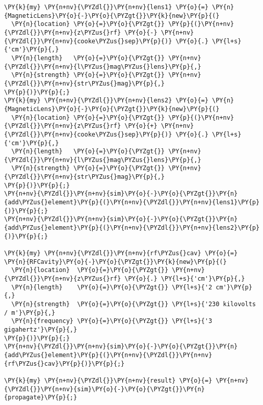\begin{Verbatim}[commandchars=\\\{\}]
\PY{k}{my} \PY{n+nv}{\PYZdl{}}\PY{n+nv}{lens1} \PY{o}{=} \PY{n}{MagneticLens}\PY{o}{-}\PY{o}{\PYZgt{}}\PY{k}{new}\PY{p}{(}
  \PY{n}{location} \PY{o}{=}\PY{o}{\PYZgt{}} \PY{p}{(}\PY{n+nv}{\PYZdl{}}\PY{n+nv}{z\PYZus{}rf} \PY{o}{-} \PY{n+nv}{\PYZdl{}}\PY{n+nv}{cooke\PYZus{}sep}\PY{p}{)} \PY{o}{.} \PY{l+s}{'cm'}\PY{p}{,}
  \PY{n}{length}   \PY{o}{=}\PY{o}{\PYZgt{}} \PY{n+nv}{\PYZdl{}}\PY{n+nv}{l\PYZus{}mag\PYZus{}lens}\PY{p}{,}
  \PY{n}{strength} \PY{o}{=}\PY{o}{\PYZgt{}} \PY{n+nv}{\PYZdl{}}\PY{n+nv}{str\PYZus{}mag}\PY{p}{,}
\PY{p}{)}\PY{p}{;}
\PY{k}{my} \PY{n+nv}{\PYZdl{}}\PY{n+nv}{lens2} \PY{o}{=} \PY{n}{MagneticLens}\PY{o}{-}\PY{o}{\PYZgt{}}\PY{k}{new}\PY{p}{(}
  \PY{n}{location} \PY{o}{=}\PY{o}{\PYZgt{}} \PY{p}{(}\PY{n+nv}{\PYZdl{}}\PY{n+nv}{z\PYZus{}rf} \PY{o}{+} \PY{n+nv}{\PYZdl{}}\PY{n+nv}{cooke\PYZus{}sep}\PY{p}{)} \PY{o}{.} \PY{l+s}{'cm'}\PY{p}{,}
  \PY{n}{length}   \PY{o}{=}\PY{o}{\PYZgt{}} \PY{n+nv}{\PYZdl{}}\PY{n+nv}{l\PYZus{}mag\PYZus{}lens}\PY{p}{,}
  \PY{n}{strength} \PY{o}{=}\PY{o}{\PYZgt{}} \PY{n+nv}{\PYZdl{}}\PY{n+nv}{str\PYZus{}mag}\PY{p}{,}
\PY{p}{)}\PY{p}{;}
\PY{n+nv}{\PYZdl{}}\PY{n+nv}{sim}\PY{o}{-}\PY{o}{\PYZgt{}}\PY{n}{add\PYZus{}element}\PY{p}{(}\PY{n+nv}{\PYZdl{}}\PY{n+nv}{lens1}\PY{p}{)}\PY{p}{;}
\PY{n+nv}{\PYZdl{}}\PY{n+nv}{sim}\PY{o}{-}\PY{o}{\PYZgt{}}\PY{n}{add\PYZus{}element}\PY{p}{(}\PY{n+nv}{\PYZdl{}}\PY{n+nv}{lens2}\PY{p}{)}\PY{p}{;}

\PY{k}{my} \PY{n+nv}{\PYZdl{}}\PY{n+nv}{rf\PYZus{}cav} \PY{o}{=} \PY{n}{RFCavity}\PY{o}{-}\PY{o}{\PYZgt{}}\PY{k}{new}\PY{p}{(}
  \PY{n}{location}  \PY{o}{=}\PY{o}{\PYZgt{}} \PY{n+nv}{\PYZdl{}}\PY{n+nv}{z\PYZus{}rf} \PY{o}{.} \PY{l+s}{'cm'}\PY{p}{,}
  \PY{n}{length}    \PY{o}{=}\PY{o}{\PYZgt{}} \PY{l+s}{'2 cm'}\PY{p}{,}
  \PY{n}{strength}  \PY{o}{=}\PY{o}{\PYZgt{}} \PY{l+s}{'230 kilovolts / m'}\PY{p}{,}
  \PY{n}{frequency} \PY{o}{=}\PY{o}{\PYZgt{}} \PY{l+s}{'3 gigahertz'}\PY{p}{,}
\PY{p}{)}\PY{p}{;}
\PY{n+nv}{\PYZdl{}}\PY{n+nv}{sim}\PY{o}{-}\PY{o}{\PYZgt{}}\PY{n}{add\PYZus{}element}\PY{p}{(}\PY{n+nv}{\PYZdl{}}\PY{n+nv}{rf\PYZus{}cav}\PY{p}{)}\PY{p}{;}

\PY{k}{my} \PY{n+nv}{\PYZdl{}}\PY{n+nv}{result} \PY{o}{=} \PY{n+nv}{\PYZdl{}}\PY{n+nv}{sim}\PY{o}{-}\PY{o}{\PYZgt{}}\PY{n}{propagate}\PY{p}{;}
\end{Verbatim}
